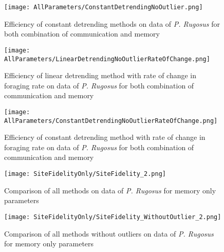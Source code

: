 \begin{figure}
	\texttt{[image: AllParameters/ConstantDetrendingNoOutlier.png]}
	\caption{Efficiency of constant detrending methods on data of \textit{P. Rugosus} for both combination of communication and memory}
\end{figure}
\begin{figure}
	\texttt{[image: AllParameters/LinearDetrendingNoOutlierRateOfChange.png]}
	\caption{Efficiency of linear detrending method with rate of change in foraging rate on data of \textit{P. Rugosus} for both combination of communication and memory}
\end{figure}
\begin{figure}
	\texttt{[image: AllParameters/ConstantDetrendingNoOutlierRateOfChange.png]}
	\caption{Efficiency of constant detrending method with rate of change in foraging rate on data of \textit{P. Rugosus} for both combination of communication and memory}
\end{figure}
\begin{figure}
	\texttt{[image: SiteFidelityOnly/SiteFidelity\_2.png]}
	\caption{Comparison of all methods on data of \textit{P. Rugosus} for memory only parameters}
\end{figure}
\begin{figure}
	\texttt{[image: SiteFidelityOnly/SiteFidelity\_WithoutOutlier\_2.png]}
	\caption{Comparison of all methods without outliers on data of \textit{P. Rugosus} for memory only parameters}
\end{figure}
